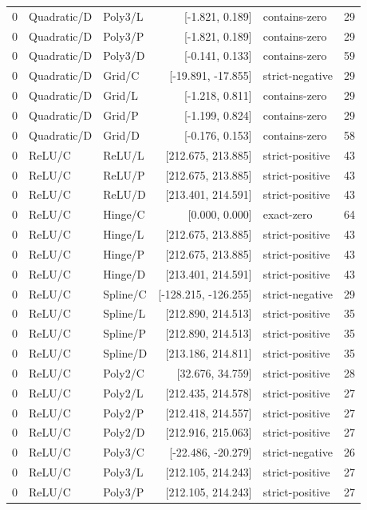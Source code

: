 \begin{longtable}{lllrlr}
0 & Quadratic/D & Poly3/L & [-1.821, 0.189] & contains-zero & 29 \\
0 & Quadratic/D & Poly3/P & [-1.821, 0.189] & contains-zero & 29 \\
0 & Quadratic/D & Poly3/D & [-0.141, 0.133] & contains-zero & 59 \\
0 & Quadratic/D & Grid/C & [-19.891, -17.855] & strict-negative & 29 \\
0 & Quadratic/D & Grid/L & [-1.218, 0.811] & contains-zero & 29 \\
0 & Quadratic/D & Grid/P & [-1.199, 0.824] & contains-zero & 29 \\
0 & Quadratic/D & Grid/D & [-0.176, 0.153] & contains-zero & 58 \\
0 & ReLU/C & ReLU/L & [212.675, 213.885] & strict-positive & 43 \\
0 & ReLU/C & ReLU/P & [212.675, 213.885] & strict-positive & 43 \\
0 & ReLU/C & ReLU/D & [213.401, 214.591] & strict-positive & 43 \\
0 & ReLU/C & Hinge/C & [0.000, 0.000] & exact-zero & 64 \\
0 & ReLU/C & Hinge/L & [212.675, 213.885] & strict-positive & 43 \\
0 & ReLU/C & Hinge/P & [212.675, 213.885] & strict-positive & 43 \\
0 & ReLU/C & Hinge/D & [213.401, 214.591] & strict-positive & 43 \\
0 & ReLU/C & Spline/C & [-128.215, -126.255] & strict-negative & 29 \\
0 & ReLU/C & Spline/L & [212.890, 214.513] & strict-positive & 35 \\
0 & ReLU/C & Spline/P & [212.890, 214.513] & strict-positive & 35 \\
0 & ReLU/C & Spline/D & [213.186, 214.811] & strict-positive & 35 \\
0 & ReLU/C & Poly2/C & [32.676, 34.759] & strict-positive & 28 \\
0 & ReLU/C & Poly2/L & [212.435, 214.578] & strict-positive & 27 \\
0 & ReLU/C & Poly2/P & [212.418, 214.557] & strict-positive & 27 \\
0 & ReLU/C & Poly2/D & [212.916, 215.063] & strict-positive & 27 \\
0 & ReLU/C & Poly3/C & [-22.486, -20.279] & strict-negative & 26 \\
0 & ReLU/C & Poly3/L & [212.105, 214.243] & strict-positive & 27 \\
0 & ReLU/C & Poly3/P & [212.105, 214.243] & strict-positive & 27 \\

\end{longtable}
